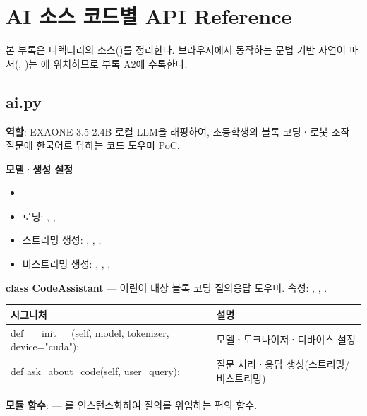 \section{AI 소스 코드별 API Reference}

본 부록은  디렉터리의 소스()를 정리한다. 브라우저에서
동작하는 문법 기반 자연어 파서(,
)는 에 위치하므로 부록 A2에 수록한다.

\subsection{ai.py}

\noindent\textbf{역할}: EXAONE-3.5-2.4B 로컬 LLM을 래핑하여, 초등학생의 블록
코딩\textbf{·}로봇 조작 질문에 한국어로 답하는 코드 도우미 PoC.

\noindent\textbf{모델\textbf{·}생성 설정}
\begin{itemize}
  \item {}
  \item 로딩: , ,
  \item 스트리밍 생성: , ,
        , 
  \item 비스트리밍 생성: , ,
        , 
\end{itemize}

\noindent\textbf{class CodeAssistant} --- 어린이 대상 블록 코딩 질의응답 도우미.
속성: , , .

\begin{longtable}{S{8.6cm} L{5.4cm}}
\toprule
{}\normalfont\sffamily\bfseries 시그니처 & \normalfont\sffamily\bfseries 설명 \\
\midrule
\endhead
def \_\_init\_\_(self, model, tokenizer, device="cuda"): & 모델\textbf{·}토크나이저\textbf{·}디바이스 설정 \\
def ask\_about\_code(self, user\_query): & 질문 처리\textbf{·}응답 생성(스트리밍/비스트리밍) \\
\bottomrule
\end{longtable}

\noindent\textbf{모듈 함수}:  ---
를 인스턴스화하여 질의를 위임하는 편의 함수.

